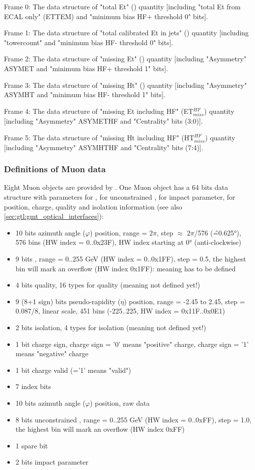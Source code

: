 Frame 0: The data structure of "total Et" (\ett) quantity [including "total Et from ECAL only" (ETTEM) and "minimum bias HF+ threshold 0" bits].

Frame 1: The data structure of "total calibrated Et in jets" (\htt) quantity [including "towercount" and "minimum bias HF- threshold 0" bits].

Frame 2: The data structure of "missing Et" (\etm) quantity [including "Asymmetry" ASYMET and "minimum bias HF+ threshold 1" bits].

Frame 3: The data structure of "missing Ht" (\htm) quantity [including "Asymmetry" ASYMHT and "minimum bias HF- threshold 1" bits].

Frame 4: The data structure of "missing Et including HF" (ET$_{miss}^{HF}$) quantity [including "Asymmetry" ASYMETHF and "Centrality" bits (3:0)].

Frame 5: The data structure of "missing Ht including HF" (HT$_{miss}^{HF}$) quantity [including "Asymmetry" ASYMHTHF and "Centrality" bits (7:4)].

\clearpage

\subsubsection{Definitions of Muon data}
\label{sec:gtl:muon_data}
Eight Muon objects are provided by \gmt. One Muon object has a 64 bits data structure with parameters for \pt, for unconstrained \pt, for impact parameter, for position, charge, quality and isolation information (see also \ref{sec:gtl:gmt_optical_interfaces}):\\
\begin{itemize}
\item 10 bits azimuth angle ($\varphi$) position, range = 2$\pi$, step $\approx$ 2$\pi$/576 (\^=0.625°), 576 bins (HW index = 0..0x23F), HW index starting at 0° (anti-clockwise)
\item 9 bits \pt, range = 0..255 GeV (HW index = 0..0x1FF), step = 0.5, the highest bin will mark an overflow (HW index 0x1FF): meaning has to be defined
\item 4 bits quality, 16 types for quality (meaning not defined yet!)
\item 9 (8+1 sign) bits pseudo-rapidity ($\eta$) position, range = -2.45 to 2.45, step = 0.087/8, linear scale, 451 bins (-225..225, HW index = 0x11F..0x0E1)
\item 2 bits isolation, 4 types for isolation (meaning not defined yet!)
\item 1 bit charge sign, charge sign = '0' means "positive" charge, charge sign = '1' means "negative" charge
\item 1 bit charge valid (='1' means "valid")
\item 7 index bits
\item 10 bits azimuth angle ($\varphi$) position, raw data
\item 8 bits unconstrained \pt, range = 0..255 GeV (HW index = 0..0xFF), step = 1.0, the highest bin will mark an overflow (HW index 0xFF)
\item 1 spare bit
\item 2 bits impact parameter
\end{itemize}

